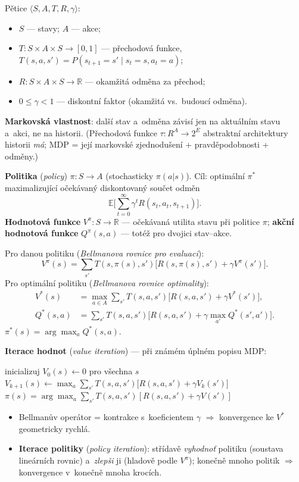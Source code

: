 \documentclass[11pt,a4paper]{article}
\theoremstyle{definition}
\begin{document}
\begin{defbox}
Pětice $\langle S, A, T, R, \gamma\rangle$:
\begin{itemize}
\item $S$ --- stavy; $A$ --- akce;
\item $T : S \times A \times S \to [0,1]$ --- přechodová funkce,
  $T(s,a,s') = P(s_{t+1}=s' \mid s_t=s, a_t=a)$;
\item $R : S \times A \times S \to \mathbb{R}$ --- okamžitá odměna za přechod;
\item $0 \le \gamma < 1$ --- diskontní faktor (okamžitá vs.\ budoucí odměna).
\end{itemize}
\textbf{Markovská vlastnost}: další stav a~odměna závisí jen na aktuálním stavu a~akci, ne na
historii. (Přechodová funkce $\tau : R^A \to 2^E$ abstraktní architektury historii \emph{má};
MDP = její markovské zjednodušení + pravděpodobnosti + odměny.)

\textbf{Politika} (\emph{policy}) $\pi : S \to A$ (stochasticky $\pi(a|s)$). Cíl: optimální
$\pi^*$ maximalizující očekávaný diskontovaný součet odměn
\[
\mathbb{E}\Big[ \sum_{t=0}^{\infty} \gamma^t R(s_t, a_t, s_{t+1}) \Big].
\]
\textbf{Hodnotová funkce} $V^\pi : S \to \mathbb{R}$ --- očekávaná utilita stavu při politice
$\pi$; \textbf{akční hodnotová funkce} $Q^\pi(s,a)$ --- totéž pro dvojici stav--akce.
\end{defbox}

\begin{defbox}
Pro danou politiku (\emph{Bellmanova rovnice pro evaluaci}):
\[
V^\pi(s) = \sum_{s'} T(s,\pi(s),s') \big[ R(s,\pi(s),s') + \gamma V^\pi(s') \big].
\]
Pro optimální politiku (\emph{Bellmanova rovnice optimality}):
\begin{align*}
V^*(s) &= \max_{a \in A} \sum_{s'} T(s,a,s') \big[ R(s,a,s') + \gamma V^*(s')\big], \\
Q^*(s,a) &= \sum_{s'} T(s,a,s')\big[R(s,a,s') + \gamma \max_{a'} Q^*(s',a')\big].
\end{align*}
$\pi^*(s) = \arg\max_a Q^*(s,a)$.
\end{defbox}

\noindent\textbf{Iterace hodnot} (\emph{value iteration}) --- při známém úplném popisu MDP:
\begin{algorithmic}[1]
\State inicializuj $V_0(s) \gets 0$ pro všechna $s$
\Repeat
    \State $V_{k+1}(s) \gets \max_{a} \sum_{s'} T(s,a,s')\big[R(s,a,s') + \gamma V_k(s')\big]$
  \EndFor
{}
\State \Return $\pi(s) = \arg\max_a \sum_{s'} T(s,a,s')[R(s,a,s') + \gamma V(s')]$
\end{algorithmic}
\begin{itemize}
\item Bellmanův operátor = kontrakce s~koeficientem $\gamma$ $\Rightarrow$ konvergence ke
  $V^*$ geometricky rychlá.
\item \textbf{Iterace politiky} (\emph{policy iteration}): střídavě \emph{vyhodnoť} politiku
  (soustava lineárních rovnic) a~\emph{zlepši} ji (hladově podle $V^\pi$); konečně mnoho
  politik $\Rightarrow$ konvergence v~konečně mnoha krocích.
\end{itemize}
\end{document}

